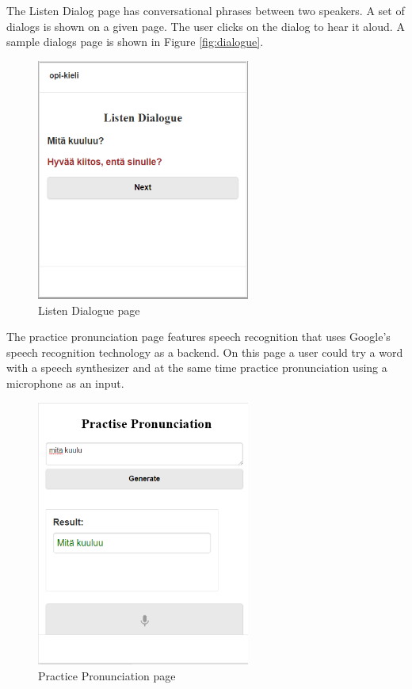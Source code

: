 \documentclass[11pt,a4paper,oneside,article]{memoir}
\begin{document}
The Listen Dialog page has conversational phrases between two speakers. A set of dialogs is shown on a given page. The user clicks on the dialog to hear it aloud. A sample dialogs page is shown in Figure \vref{fig:dialogue}.

\begin{figure}[h]
\includegraphics[width=7cm]{dialogue}
\caption{Listen Dialogue page}
\label{fig:dialogue}
\end{figure}

The practice pronunciation page features speech recognition that uses Google's speech recognition technology as a backend. On this page a user could try a word with a speech synthesizer and at the same time practice pronunciation using a microphone as an input.
\begin{figure}[h]
\includegraphics[width=7cm]{pronunciation}
\caption{Practice Pronunciation page}
\label{fig:pronunciation}
\end{figure}
\end{document}
